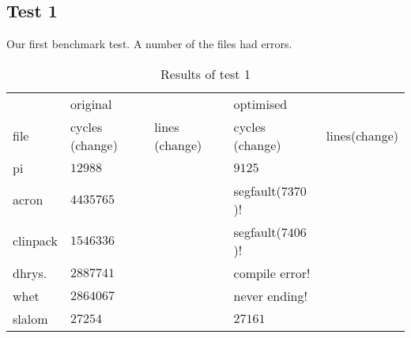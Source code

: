 \subsection{Test 1}

Our first benchmark test. A number of the files had errors.

\begin{table}[ht]
\centering
\begin{tabular}{l l l l l}
\toprule
        &original           &               &optimised          &             \\
file    &cycles (change)    &lines (change) &cycles (change)    &lines(change)\\
\midrule
pi      &$12988$            &               &$9125$             &             \\
acron   &$4435765$          &               &segfault($7370$)!  &             \\
clinpack&$1546336$          &               &segfault($7406$)!  &             \\
dhrys.  &$2887741$          &               &compile error!     &             \\
whet    &$2864067$          &               &never ending!      &             \\
slalom  &$27254$            &               &$27161$            &             \\
\bottomrule
\end{tabular}
\caption{Results of test 1}
\label{tab:test1}
\end{table}
